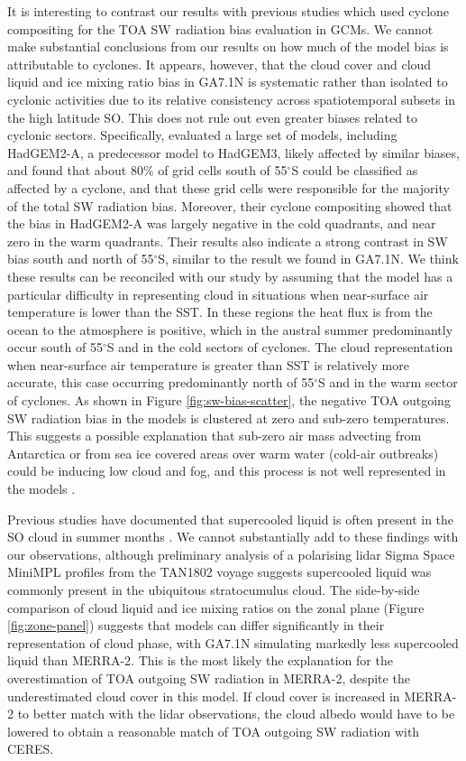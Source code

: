 It is interesting to contrast our results with previous studies which used
cyclone compositing for the TOA SW radiation bias evaluation in GCMs. We cannot
make substantial conclusions from our results on how much of the model bias is
attributable to cyclones. It appears, however, that the cloud cover and cloud
liquid and ice mixing ratio bias in GA7.1N is systematic rather than isolated to
cyclonic activities due to its relative consistency across spatiotemporal
subsets in the high latitude SO. This does not rule out even greater biases
related to cyclonic sectors. Specifically, \cite{bodas-salcedo2014} evaluated a
large set of models, including HadGEM2-A, a predecessor model to HadGEM3,
likely affected by similar biases, and found that about 80\% of grid cells
south of 55$^\circ$S could be classified as affected by a cyclone, and that
these grid cells were responsible for the majority of the total SW radiation
bias.  Moreover, their cyclone compositing showed that the bias in HadGEM2-A
was largely negative in the cold quadrants, and near zero in the warm
quadrants.  Their results also indicate a strong contrast in SW bias south and
north of 55$^\circ$S, similar to the result we found in GA7.1N.  We think these
results can be reconciled with our study by assuming that the model has a
particular difficulty in representing cloud in situations when near-surface air
temperature is lower than the SST. In these regions the heat flux is from the
ocean to the atmosphere is positive, which in the austral summer predominantly
occur south of 55$^\circ$S and in the cold sectors of cyclones. The cloud
representation when near-surface air temperature is greater than SST is
relatively more accurate, this case occurring predominantly north of
55$^\circ$S and in the warm sector of cyclones.  As shown in Figure
\ref{fig:sw-bias-scatter}, the negative TOA outgoing SW radiation bias in the
models is clustered at zero and sub-zero temperatures. This suggests a
possible explanation that sub-zero air mass advecting from Antarctica or from
sea ice covered areas over warm water (cold-air outbreaks) could be inducing low cloud and fog, and
this process is not well represented in the models \citep{bodas-salcedo2012}.

Previous studies have documented that supercooled liquid is often present in
the SO cloud in summer months \citep{morrison2011,huang2012,chubb2013,huang2016,bodas-salcedo2016,jolly2018,listowski2019}. We cannot substantially add to these findings
with our observations, although preliminary analysis of a polarising lidar
Sigma Space MiniMPL profiles from the TAN1802 voyage suggests supercooled
liquid was commonly present in the ubiquitous stratocumulus cloud. The
side-by-side comparison of cloud liquid and ice mixing ratios on the zonal
plane (Figure \ref{fig:zone-panel}) suggests that models can differ
significantly in their representation of cloud phase, with GA7.1N simulating
markedly less supercooled liquid than MERRA-2. This is the most likely
the explanation for the overestimation of TOA outgoing SW radiation in MERRA-2,
despite the underestimated cloud cover in this model. If cloud cover is
increased in MERRA-2 to better match with the lidar observations, the cloud
albedo would have to be lowered to obtain a reasonable match of TOA outgoing SW
radiation with CERES.

